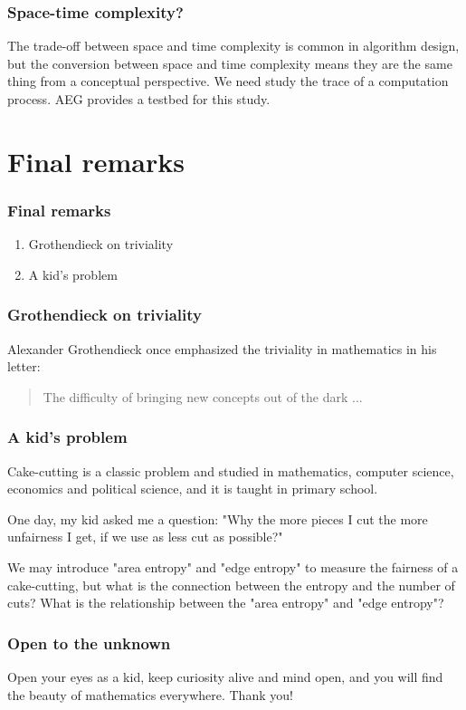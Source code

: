 \documentclass[aspectratio=169]{beamer}
\begin{document}
\begin{frame}
    \frametitle{Space-time complexity?}
    The trade-off between space and time complexity is common in algorithm design,
    but the conversion between space and time complexity means they are the same thing from a conceptual perspective.
    We need study the trace of a computation process.
    AEG provides a testbed for this study.
\end{frame}

\section{Final remarks}

\begin{frame}
    \frametitle{Final remarks}
    \begin{enumerate}
        \item Grothendieck on triviality
        \item A kid's problem
    \end{enumerate}
\end{frame}

\begin{frame}
    \frametitle{Grothendieck on triviality}
    Alexander Grothendieck once emphasized the triviality in mathematics in his letter:
    \newline\newline
    \begin{center}
        \begin{quote}
            The difficulty of bringing new concepts out of the dark ...
        \end{quote}
    \end{center}
\end{frame}

\begin{frame}
    \frametitle{A kid's problem}
    Cake-cutting is a classic problem and studied in mathematics, computer science, economics and political science,
    and it is taught in primary school.

    One day, my kid asked me a question: "Why the more pieces I cut the more unfairness I get, if we use as less cut as possible?"
    \begin{figure}[ht]\centering
    \end{figure}
    We may introduce "area entropy" and "edge entropy" to measure the fairness of a cake-cutting, but what is the connection between
    the entropy and the number of cuts? What is the relationship between the "area entropy" and "edge entropy"?
\end{frame}

\begin{frame}
    \frametitle{Open to the unknown}
    Open your eyes as a kid, keep curiosity alive and mind open, and you will find the beauty of mathematics everywhere.
    \newline Thank you!
\end{frame}
\end{document}
